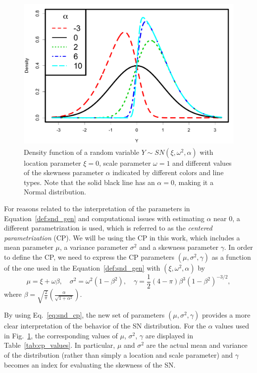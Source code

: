 \documentclass[11pt, oneside]{article}
\begin{document}
\begin{figure}[htbp]
   \centering
\includegraphics[height = 3in]{Skew_Normal_densities_jjck.pdf} 
   \caption{Density function of a random variable $Y \sim SN(\xi, \omega^{2}, \alpha)$ with location parameter $\xi = 0$, scale parameter $\omega = 1$ and different values of the skewness parameter $\alpha$ indicated by different colors and line types. Note that the solid black line has an $\alpha = 0$, making it a Normal distribution.}
   \label{fig:SN.plot}
\end{figure}
%
For reasons related to the interpretation of the parameters in Equation~\eqref{def:snd_gen} and computational issues with estimating $\alpha$ near 0, a different parametrization is used, which is referred to as the \emph{centered parametrization} (CP).  We will be using the CP in this work, which includes a mean parameter $\mu$, a variance parameter $\sigma^2$ and a skewness parameter $\gamma$.  In order to define the CP, we need to express the CP parameters $(\mu, \sigma^2, \gamma)$ as a function of the one used in the Equation~\eqref{def:snd_gen} with $(\xi, \omega^2, \alpha)$ by
%
\begin{equation} \label{eq:snd_cp}
\mu = \xi + \omega \beta, \quad \sigma^{2} = \omega^{2}(1-\beta^2), \quad \gamma = \frac{1}{2}(4-\pi) \beta^{3}\left(1-\beta^2\right)^{-3/2},
\end{equation}
%
where $\beta = \sqrt{\frac{2}{\pi}}\left(\frac{\alpha}{\sqrt{1+\alpha^2}}\right)$.

By using Eq.~\eqref{eq:snd_cp}, the new set of parameters $(\mu, \sigma^2, \gamma)$ provides a more clear interpretation of the behavior of the SN distribution. For the $\alpha$ values used in Fig.~\ref{fig:SN.plot}, the corresponding values of $\mu$, $\sigma^2$, $\gamma$ are displayed in Table~\ref{tab:cp_values}.  In particular, $\mu$ and $\sigma^2$ are the actual mean and variance of the distribution (rather than simply a location and scale parameter) and $\gamma$ becomes an index for evaluating the skewness of the SN. 
\end{document}
